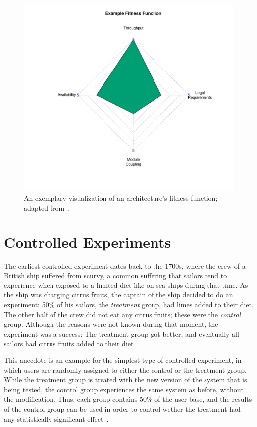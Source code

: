 \begin{figure}[h]
        \includegraphics[width=\textwidth]{gfx/fitness-function-example}
        \caption{An exemplary visualization of an architecture's fitness function; adapted from~\cite{WEB:EvolArch:2016}.}
        \label{figure:fundamentals:evolutionary:fitness}
\end{figure}

\section{Controlled Experiments}
\label{sec:fundamentals:experiments}

The earliest controlled experiment dates back to the 1700s, where the crew of a British ship suffered from scurvy, a common suffering that sailors tend to experience when exposed to a limited diet like on sea ships during that time.
As the ship was charging citrus fruits, the captain of the ship decided to do an experiment: 50\% of his sailors, the \emph{treatment} group, had limes added to their diet.
The other half of the crew did not eat any citrus fruits; these were the \emph{control} group.
Although the reasons were not known during that moment, the experiment was a success: The treatment group got better, and eventually all sailors had citrus fruits added to their diet~\cite{rossi2003evaluation,marks2000progress}.

This anecdote is an example for the simplest type of controlled experiment, in which users are randomly assigned to either the control or the treatment group.
While the treatment group is treated with the new version of the system that is being tested, the control group experiences the same system as before, without the modification.
Thus, each group contains 50\% of the user base, and the results of the control group can be used in order to control wether the treatment had any statistically significant effect~\cite{Kohavi2009}.

